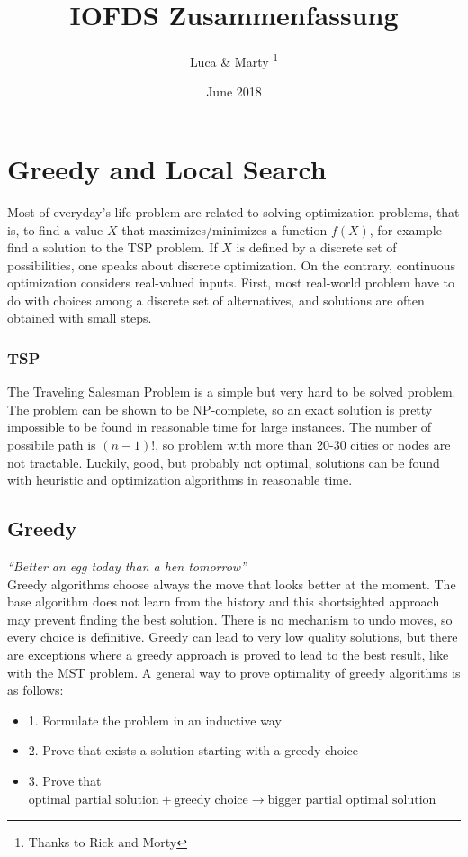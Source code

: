 \documentclass[10pt]{article}
\title{IOFDS Zusammenfassung}
\author{Luca \& Marty \thanks{Thanks to Rick and Morty}}
\date{June 2018}
\begin{document}
\begin{titlepage}
\maketitle
\end{titlepage}
 
\section{Greedy and Local Search}

Most of everyday's life problem are related to solving optimization problems, that is, to find a value $X$ that maximizes/minimizes a function $f(X)$, for example find a solution to the TSP problem. If $X$ is defined by a discrete set of possibilities, one speaks about discrete optimization. On the contrary, continuous optimization considers real-valued inputs. First, most real-world problem have to do with choices among a discrete set of alternatives, and solutions are often obtained with small steps.

\subsubsection{TSP}
The Traveling Salesman Problem is a simple but very hard to be solved problem. The problem can be shown to be NP-complete, so an exact solution is pretty impossible to be found in reasonable time for large instances. The number of possibile path is $(n-1)!$, so problem with more than 20-30 cities or nodes are not tractable. Luckily, good, but probably not optimal, solutions can be found with heuristic and optimization algorithms in reasonable time.

\subsection{Greedy}
\textit{``Better an egg today than a hen tomorrow''}\\
Greedy algorithms choose always the move that looks better at the moment. The base algorithm does not learn from the history and this shortsighted approach may prevent finding the best solution. There is no mechanism to undo moves, so every choice is definitive. Greedy can lead to very low quality solutions, but there are exceptions where a greedy approach is proved to lead to the best result, like with the MST problem.
A general way to prove optimality of greedy algorithms is as follows:
\begin{itemize}
\item{1. Formulate the problem in an inductive way}
\item{2. Prove that exists a solution starting with a greedy choice}
\item{3. Prove that $\text{optimal partial solution} + \text{greedy choice} \rightarrow \text{bigger partial optimal solution}$}
\end{itemize}
\end{document}
